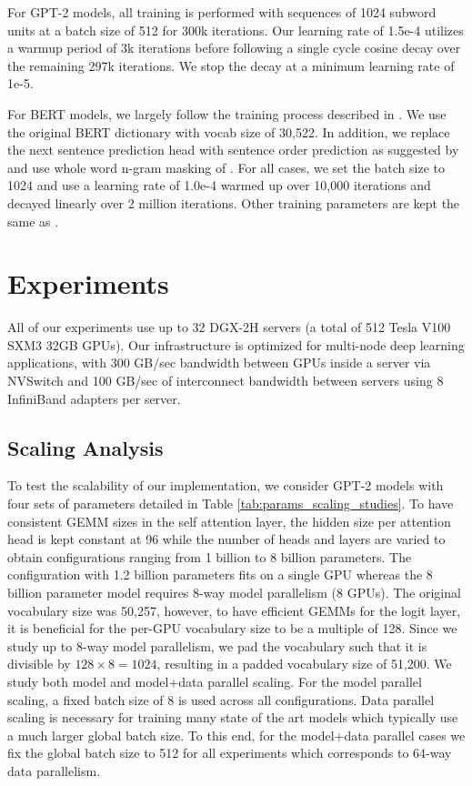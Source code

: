For GPT-2 models, all training is performed with sequences of 1024 subword units at a batch size of 512 for 300k iterations. Our learning rate of 1.5e-4 utilizes a warmup period of 3k iterations before following a single cycle cosine decay over the remaining 297k iterations. We stop the decay at a minimum learning rate of 1e-5.

For BERT models, we largely follow the training process described in \cite{ALBERT2019}. We use the original BERT dictionary with vocab size of 30,522. In addition, we replace the next sentence prediction head with sentence order prediction as suggested by \cite{ALBERT2019} and use whole word n-gram masking of \cite{SpanBERT2019}. For all cases, we set the batch size to 1024 and use a learning rate of 1.0e-4 warmed up over 10,000 iterations and decayed linearly over 2 million iterations. Other training parameters are kept the same as \cite{devlin2018bert}.

\section{Experiments}

All of our experiments use up to 32 DGX-2H servers (a total of 512 Tesla V100 SXM3 32GB GPUs). Our infrastructure is optimized for multi-node deep learning applications, with 300 GB/sec bandwidth between GPUs inside a server via NVSwitch and 100 GB/sec of interconnect bandwidth between servers using 8 InfiniBand adapters per server.

\subsection{Scaling Analysis} To test the scalability of our implementation, we consider GPT-2 models with four sets of parameters detailed in Table \ref{tab:params_scaling_studies}. To have consistent GEMM sizes in the self attention layer, the hidden size per attention head is kept constant at 96 while the number of heads and layers are varied to obtain configurations ranging from 1 billion to 8 billion parameters. The configuration with 1.2 billion parameters fits on a single GPU whereas the 8 billion parameter model requires 8-way model parallelism (8 GPUs). The original vocabulary size was 50,257, however, to have efficient GEMMs for the logit layer, it is beneficial for the per-GPU vocabulary size to be a multiple of 128. Since we study up to 8-way model parallelism, we pad the vocabulary such that it is divisible by $128\times 8=1024$, resulting in a padded vocabulary size of 51,200.  We study both model and model+data parallel scaling. For the model parallel scaling, a fixed batch size of 8 is used across all configurations. Data parallel scaling is necessary for training many state of the art models which typically use a much larger global batch size. To this end, for the model+data parallel cases we fix the global batch size to 512 for all experiments which corresponds to 64-way data parallelism. 

